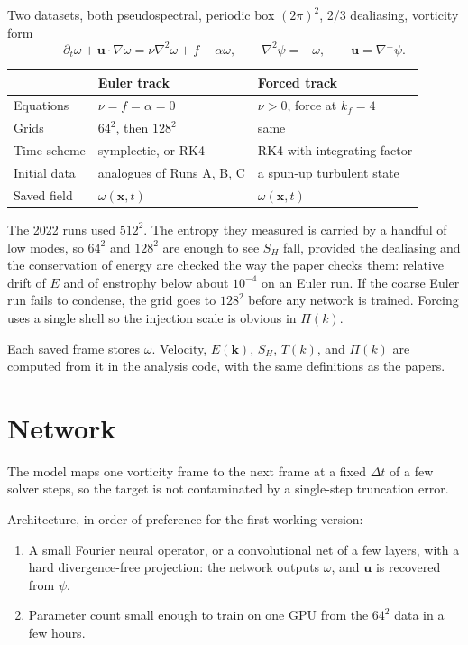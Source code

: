 \documentclass[11pt,a4paper]{article}
\begin{document}
Two datasets, both pseudospectral, periodic box \((2\pi)^2\), 2/3 dealiasing, vorticity form
\[
  \partial_t\omega + \mathbf{u}\cdot\nabla\omega = \nu\nabla^2\omega + f - \alpha\omega,
  \qquad
  \nabla^2\psi = -\omega,
  \qquad
  \mathbf{u} = \nabla^\perp\psi.
\]

\begin{center}
\small
\begin{tabular}{lll}
\toprule
& Euler track & Forced track \\
\midrule
Equations & \(\nu = f = \alpha = 0\) & \(\nu > 0\), force at \(k_f = 4\) \\
Grids & \(64^2\), then \(128^2\) & same \\
Time scheme & symplectic, or RK4 & RK4 with integrating factor \\
Initial data & analogues of Runs A, B, C & a spun-up turbulent state \\
Saved field & \(\omega(\mathbf{x},t)\) & \(\omega(\mathbf{x},t)\) \\
\bottomrule
\end{tabular}
\end{center}

The 2022 runs used \(512^2\).
The entropy they measured is carried by a handful of low modes, so \(64^2\) and \(128^2\) are enough to see \(S_H\) fall, provided the dealiasing and the conservation of energy are checked the way the paper checks them: relative drift of \(E\) and of enstrophy below about \(10^{-4}\) on an Euler run.
If the coarse Euler run fails to condense, the grid goes to \(128^2\) before any network is trained.
Forcing uses a single shell so the injection scale is obvious in \(\Pi(k)\).

Each saved frame stores \(\omega\).
Velocity, \(E(\mathbf{k})\), \(S_H\), \(T(k)\), and \(\Pi(k)\) are computed from it in the analysis code, with the same definitions as the papers.

\section{Network}

The model maps one vorticity frame to the next frame at a fixed \(\Delta t\) of a few solver steps, so the target is not contaminated by a single-step truncation error.

Architecture, in order of preference for the first working version:
\begin{enumerate}
  \item A small Fourier neural operator, or a convolutional net of a few layers, with a hard divergence-free projection: the network outputs \(\omega\), and \(\mathbf{u}\) is recovered from \(\psi\).
  \item Parameter count small enough to train on one GPU from the \(64^2\) data in a few hours.
\end{enumerate}
\end{document}
